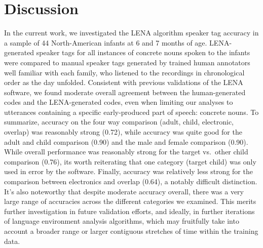 \documentclass[man,floatsintext]{apa6}
\theoremstyle{definition}
\theoremstyle{definition}
\theoremstyle{definition}
\theoremstyle{remark}
\begin{document}
\hypertarget{discussion}{%
\section{Discussion}\label{discussion}}

In the current work, we investigated the LENA algorithm speaker tag
accuracy in a sample of 44 North-American infants at 6 and 7 months of
age. LENA-generated speaker tags for all instances of concrete nouns
spoken to the infants were compared to manual speaker tags generated by
trained human annotators well familiar with each family, who listened to
the recordings in chronological order as the day unfolded. Consistent
with previous validations of the LENA software, we found moderate
overall agreement between the human-generated codes and the
LENA-generated codes, even when limiting our analyses to utterances
containing a specific early-produced part of speech: concrete nouns. To
summarize, accuracy on the four way comparison (adult, child,
electronic, overlap) was reasonably strong (0.72), while accuracy was
quite good for the adult and child comparison (0.90) and the male and
female comparison (0.90). While overall performance was reasonably
strong for the target vs.~other child comparison (0.76), its worth
reiterating that one category (target child) was only used in error by
the software. Finally, accuracy was relatively less strong for the
comparison between electronics and overlap (0.64), a notably difficult
distinction. It's also noteworthy that despite moderate accuracy
overall, there was a very large range of accuracies across the different
categories we examined. This merits further investigation in future
validation efforts, and ideally, in further iterations of language
environment analysis algorithms, which may fruitfully take into account
a broader range or larger contiguous stretches of time within the
training data.
\end{document}
